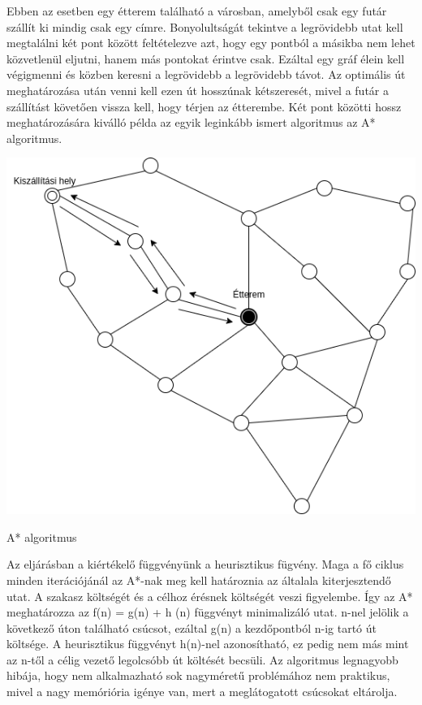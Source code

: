 

Ebben az esetben egy étterem található a városban, amelyből csak egy futár szállít ki mindig csak egy címre.
Bonyolultságát tekintve a legrövidebb utat kell megtalálni két pont között feltételezve azt, hogy egy pontból a másikba nem lehet közvetlenül eljutni, hanem más pontokat érintve csak. Ezáltal egy gráf élein kell végigmenni és közben keresni a legrövidebb a legrövidebb távot. Az optimális út meghatározása után venni kell ezen út hosszúnak kétszeresét, mivel a futár a szállítást követően vissza kell, hogy térjen az étterembe. Két pont közötti hossz meghatározására kiválló példa az egyik leginkább ismert algoritmus az A* algoritmus.

\includegraphics[scale=0.5]{images/Astar.png}


A* algoritmus

Az eljárásban a kiértékelő függvényünk a heurisztikus fügvény. Maga a fő ciklus minden iterációjánál az A*-nak meg kell határoznia az általala kiterjesztendő utat. A szakasz költségét és a célhoz érésnek költségét veszi figyelembe. Így az A* meghatározza az f(n) = g(n) + h (n) függvényt minimalizáló utat. n-nel jelölik a következő úton található csúcsot, ezáltal g(n) a kezdőpontból n-ig tartó út költsége. A heurisztikus függvényt h(n)-nel azonosítható, ez pedig nem más mint az n-től a célig vezető legolcsóbb út költését becsüli.
Az algoritmus legnagyobb hibája, hogy nem alkalmazható sok nagyméretű problémához nem praktikus, mivel a nagy memóriória igénye van, mert a meglátogatott csúcsokat eltárolja.

